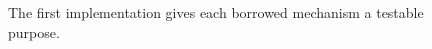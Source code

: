 \begin{figure}[H]
\centering
{}
\caption{The first implementation gives each borrowed mechanism a testable purpose.}\label{fig:teach-M04-14}
\end{figure}
